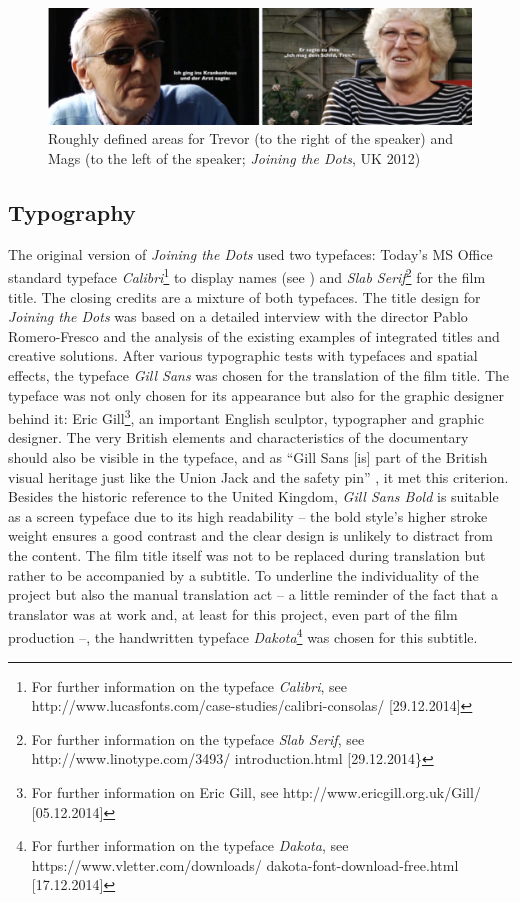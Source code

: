 \documentclass[output=paper]{langsci/langscibook}
\begin{document}
\begin{figure}
 \includegraphics[width=\textwidth]{figures/Fox5.png}
 \caption{Roughly defined areas for Trevor (to the right of the speaker) and Mags (to the left of the speaker; \textit{Joining the Dots}, UK 2012)}
 \label{fox:fig:5}
\end{figure} 


\subsection{Typography}

The original version of \textit{Joining the Dots} used two typefaces: Today's MS Office standard typeface \textit{Calibri}\footnote{For further information on the typeface \textit{Calibri}, see http://www.lucasfonts.com/case-studies/calibri-consolas/ [29.12.2014]} to display names (see ) and \textit{Slab Serif}\footnote{For further information on the typeface \textit{Slab Serif}, see http://www.linotype.com/3493/ introduction.html [29.12.2014\}} for the film title. The closing credits are a mixture of both typefaces. The title design for \textit{Joining the Dots} was based on a detailed interview with the director Pablo Romero-Fresco and the analysis of the existing examples of integrated titles and creative solutions. After various typographic tests with typefaces and spatial effects, the typeface \textit{Gill Sans} was chosen for the translation of the film title. The typeface was not only chosen for its appearance but also for the graphic designer behind it: Eric Gill\footnote{For further information on Eric Gill, see http://www.ericgill.org.uk/Gill/ [05.12.2014]}, an important English sculptor, typographer and graphic designer. The very British elements and characteristics of the documentary should also be visible in the typeface, and as ``Gill Sans [is] part of the British visual heritage just like the Union Jack and the safety pin'' \citep{WQ01}, it met this criterion. Besides the historic reference to the United Kingdom, \textit{Gill Sans Bold} is suitable as a screen typeface due to its high readability -- the bold style's higher stroke weight ensures a good contrast and the clear design is unlikely to distract from the content. The film title itself was not to be replaced during translation but rather to be accompanied by a subtitle. To underline the individuality of the project but also the manual translation act -- a little reminder of the fact that a translator was at work and, at least for this project, even part of the film production --, the handwritten typeface \textit{Dakota}\footnote{For further information on the typeface \textit{Dakota}, see https://www.vletter.com/downloads/ dakota-font-download-free.html [17.12.2014]} was chosen for this subtitle.
\end{document}
